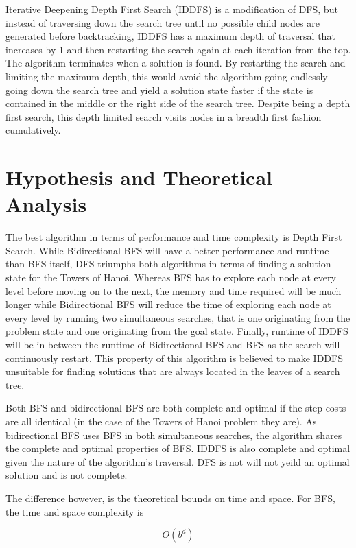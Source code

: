 \documentclass[conference]{IEEEtran}
\begin{document}
Iterative Deepening Depth First Search (IDDFS) is a modification of DFS, but instead of traversing down the search tree until no possible child nodes are generated before backtracking, IDDFS has a maximum depth of traversal that increases by 1 and then restarting the search again at each iteration from the top. The algorithm terminates when a solution is found. By restarting the search and limiting the maximum depth, this would avoid the algorithm going endlessly going down the search tree and yield a solution state faster if the state is contained in the middle or the right side of the search tree. Despite being a depth first search, this depth limited search visits nodes in a breadth first fashion cumulatively. 

\section{Hypothesis and Theoretical Analysis}

The best algorithm in terms of performance and time complexity is Depth First Search. While Bidirectional BFS will have a better performance and runtime than BFS itself, DFS triumphs both algorithms in terms of finding a solution state for the Towers of Hanoi. Whereas BFS has to explore each node at every level before moving on to the next, the memory and time required will be much longer while Bidirectional BFS will reduce the time of exploring each node at every level by running two simultaneous searches, that is one originating from the problem state and one originating from the goal state. Finally, runtime of IDDFS will be in between the runtime of Bidirectional BFS and BFS  as the search will continuously restart. This property of this algorithm is believed to make IDDFS unsuitable for finding solutions that are always located in the leaves of a search tree.

Both BFS and bidirectional BFS are both complete and optimal if the step costs are all identical (in the case of the Towers of Hanoi problem they are). As bidirectional BFS uses BFS in both simultaneous searches, the algorithm shares the complete and optimal properties of BFS. IDDFS is also complete and optimal given the nature of the algorithm's traversal. DFS is not will not yeild an optimal solution and is not complete.  

The difference however, is the theoretical bounds on time and space. For BFS, the time and space complexity is 

\begin{equation}
 O(b^d)
\end{equation}
\end{document}
